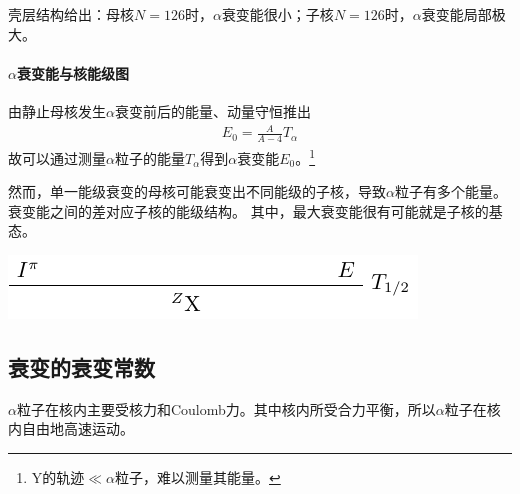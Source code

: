 壳层结构给出：母核$N=126$时，$\alpha$衰变能很小；子核$N=126$时，$\alpha$衰变能局部极大。

\paragraph{$\alpha$衰变能与核能级图}
由静止母核发生$\alpha$衰变前后的能量、动量守恒推出
\begin{align}
	E_0=\frac{A}{A-4}T_\alpha
\end{align}
故可以通过测量$\alpha$粒子的能量$T_\alpha$得到$\alpha$衰变能$E_0$。\footnote{Y的轨迹$\ll\alpha$粒子，难以测量其能量。}

然而，单一能级衰变的母核可能衰变出不同能级的子核，导致$\alpha$粒子有多个能量。衰变能之间的差对应子核的能级结构。
其中，最大衰变能很有可能就是子核的基态。

\begin{center}
	\includegraphics[page=4]{figures/tikz/layouts.pdf}
\end{center}

\subsection{\textalpha 衰变的衰变常数}

$\alpha$粒子在核内主要受核力和Coulomb力。其中核内所受合力平衡，所以$\alpha$粒子在核内自由地高速运动。

